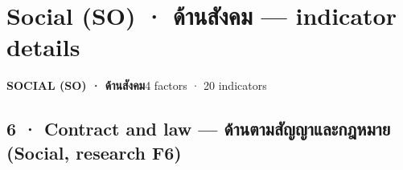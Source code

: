 \documentclass[10pt,a4paper]{article}
\begin{document}
\section{Social (SO) · ด้านสังคม — indicator details}
\begin{tcolorbox}[colback=SCbg,colframe=SCfg,boxrule=0pt,leftrule=4pt,arc=0pt,left=8pt,top=4pt,bottom=4pt]{\large\bfseries\color{SCfg}SOCIAL (SO) · ด้านสังคม}\hfill{\small\color{muted}4 factors · 20 indicators}\end{tcolorbox}
\subsection*{6 · Contract and law — ด้านตามสัญญาและกฎหมาย {\normalsize\color{muted}(Social, research F6)}}
\end{document}
